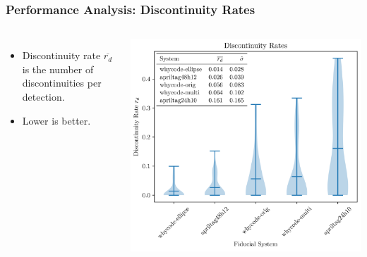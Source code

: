 \documentclass[aspectratio=169]{rubeamer}
\newcommand{\nologo}{\setbeamertemplate{logo}{}}
\newif\ifpause
\newcommand{\mypause}{\ifpause \pause \fi}
\begin{document}
\begin{frame}
\begin{tabular}{m{}m{}}
  \end{tabular}
\end{frame}

\nologo
\begin{frame}
  \frametitle{Performance Analysis: Discontinuity Rates}
  \begin{columns}
      \centering
      \begin{itemize}
        \item Discontinuity rate $\overline{r_d}$ is the number of discontinuities per detection.
        \mypause
        \item Lower is better.
      \end{itemize}
      \centering
      \onslide
      \includegraphics[width=\textwidth]{violin_plot_five_member}
  \end{columns}
\end{frame}
\end{document}
